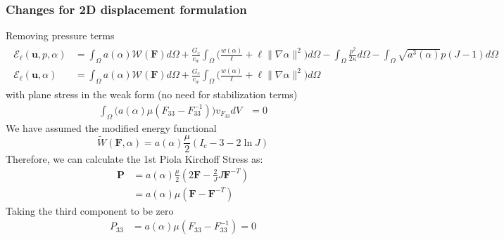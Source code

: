 \documentclass[12pt,3p]{article}
\numberwithin{equation}{section}
\begin{document}
\subsubsection{Changes for 2D displacement formulation}
Removing pressure terms
\begin{align*}
\begin{split}
\mathcal{E}_{\ell}\left(\boldsymbol{u}, p, \alpha\right) &= \int_{\Omega} a(\alpha) \mathcal{W}(\mathbf{F}) d \Omega + \frac{G_{c}}{c_{w}} \int_{\Omega} \bigg(\frac{w(\alpha)}{\ell}+\ell\|\nabla \alpha\|^{2} \bigg) d \Omega- \int_{\Omega} \frac{p^{2}}{2 \kappa} d \Omega - \int_{\Omega} \sqrt{a^{3}(\alpha)} p(J-1) d \Omega \\
\mathcal{E}_{\ell}\left(\boldsymbol{u}, \alpha\right) &= \int_{\Omega} a(\alpha) \mathcal{W}(\mathbf{F}) d \Omega + \frac{G_{c}}{c_{w}} \int_{\Omega} \bigg(\frac{w(\alpha)}{\ell}+\ell\|\nabla \alpha\|^{2} \bigg) d \Omega
\end{split}
\end{align*}
with plane stress in the weak form (no need for stabilization terms)
\begin{align*}
\int_{\Omega} \big( a(\alpha) \mu (F_{33} - F_{33}^{-1}) \big) v_{F_{33}} dV &= 0
\end{align*}
We have assumed the modified energy functional
\begin{equation}
\widetilde{W} (\mathbf{F}, \alpha) = a (\alpha) \frac{\mu}{2} (I_c - 3 - 2 \ln J) 
\end{equation}
Therefore, we can calculate the 1st Piola Kirchoff Stress as:
\begin{align*}
\mathbf{P} &= a (\alpha) \frac{\mu}{2} (2 \mathbf{F} - \frac{2}{J} J \mathbf{F}^{-T}) \\
		&= a (\alpha) \mu (\mathbf{F} - \mathbf{F}^{-T})
\end{align*}
Taking the third component to be zero
\begin{align*}
P_{33} &= a(\alpha) \mu (F_{33} - F_{33}^{-1}) = 0 
\end{align*}


\end{document}
